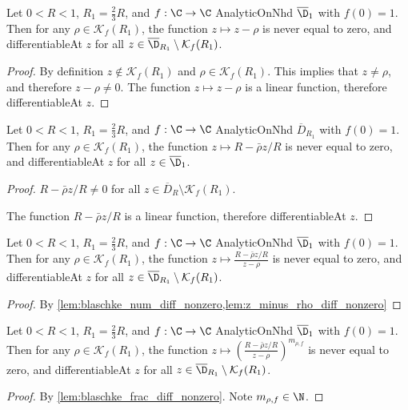 \begin{lemma}\label{lem:z_minus_rho_diff_nonzero} 
\leanok
Let $0<R<1$, $R_1=\frac{2}{3}R$, and $f:\C\to\C$ AnalyticOnNhd $\overline{\D}_1$ with $f(0)=1$. Then for any $\rho \in \mathcal{K}_f(R_1)$, the function $z \mapsto z-\rho$ is never equal to zero, and differentiableAt $z$ for all $z\in \overline{\D}_{R_1}\setminus\mathcal K_f(R_1)$.
\end{lemma}
\begin{proof}
\leanok
{}
By definition $z \notin \mathcal{K}_f(R_1)$ and $\rho \in \mathcal{K}_f(R_1)$. This implies that $z \neq \rho$, and therefore $z-\rho \neq 0$.
The function $z\mapsto z-\rho$ is a linear function, therefore differentiableAt $z$.
\end{proof}


\begin{lemma}\label{lem:blaschke_num_diff_nonzero} 
\leanok
Let $0<R<1$, $R_1=\frac{2}{3}R$, and $f:\C\to\C$ AnalyticOnNhd $\overline{D}_{R_1}$ with $f(0)=1$. Then for any $\rho \in \mathcal{K}_f(R_1)$, the function $z \mapsto R-\bar\rho z/R$ is never equal to zero, and differentiableAt $z$ for all $z\in \overline{\D}_1$.
\end{lemma}
\begin{proof}
\leanok
$R-\bar\rho z/R \neq 0$ for all $z\in  \overline{D}_R \setminus\mathcal{K}_f(R_1)$.

The function $R-\bar\rho z/R$ is a linear function, therefore differentiableAt $z$.
\end{proof}

\begin{lemma}\label{lem:blaschke_frac_diff_nonzero} 
\leanok
Let $0<R<1$, $R_1=\frac{2}{3}R$, and $f:\C\to\C$ AnalyticOnNhd $\overline{\D}_1$ with $f(0)=1$. Then for any $\rho \in \mathcal{K}_f(R_1)$, the function $z \mapsto \frac{R-\bar\rho z/R}{z-\rho}$ is never equal to zero, and differentiableAt $z$ for all $z\in \overline{\D}_{R_1}\setminus\mathcal K_f(R_1)$.
\end{lemma}
\begin{proof}
\leanok
{}
By \cref{lem:blaschke_num_diff_nonzero,lem:z_minus_rho_diff_nonzero}
\end{proof}

\begin{lemma}\label{lem:blaschke_pow_diff_nonzero} 
\leanok
Let $0<R<1$, $R_1=\frac{2}{3}R$, and $f:\C\to\C$ AnalyticOnNhd $\overline{\D}_1$ with $f(0)=1$. Then for any $\rho \in \mathcal{K}_f(R_1)$, the function $z \mapsto (\frac{R-\bar\rho z/R}{z-\rho})^{m_{\rho,f}}$ is never equal to zero, and differentiableAt $z$ for all $z\in \overline{\D}_{R_1}\setminus\mathcal K_f(R_1)$.
\end{lemma}
\begin{proof}
\leanok
{}
By \cref{lem:blaschke_frac_diff_nonzero}. Note $m_{\rho,f}\in\N$.
\end{proof}

